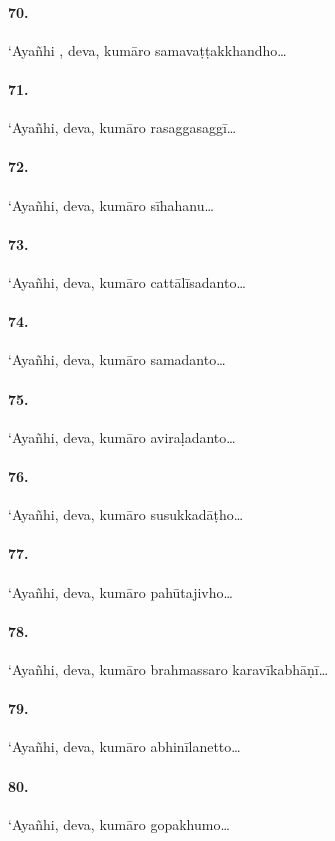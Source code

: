 \paragraph{70.} ‘Ayañhi , deva, kumāro samavaṭṭakkhandho…

\paragraph{71.} ‘Ayañhi, deva, kumāro rasaggasaggī…

\paragraph{72.} ‘Ayañhi, deva, kumāro sīhahanu…

\paragraph{73.} ‘Ayañhi, deva, kumāro cattālīsadanto…

\paragraph{74.} ‘Ayañhi, deva, kumāro samadanto…

\paragraph{75.} ‘Ayañhi, deva, kumāro aviraḷadanto…

\paragraph{76.} ‘Ayañhi, deva, kumāro susukkadāṭho…

\paragraph{77.} ‘Ayañhi, deva, kumāro pahūtajivho…

\paragraph{78.} ‘Ayañhi, deva, kumāro brahmassaro karavīkabhāṇī…

\paragraph{79.} ‘Ayañhi, deva, kumāro abhinīlanetto…

\paragraph{80.} ‘Ayañhi, deva, kumāro gopakhumo…

